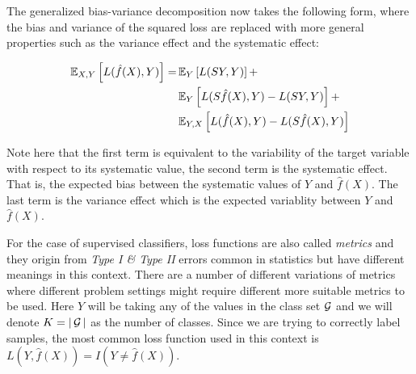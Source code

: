 The generalized bias-variance decomposition now takes the following form, where the bias and variance of the squared loss are replaced with more general properties such as the variance effect and the systematic effect:

\begin{equation}
\begin{split}
\operatorname{\mathbb{E}}_{X,Y} \left[ L(\hat{f}(X),Y )\right] = &  \operatorname{\mathbb{E}}_{Y} \left[ L(SY,Y )\right] + \\
  &  \operatorname{\mathbb{E}}_{Y} \left[ L(S\hat{f}(X),Y ) - L(SY,Y )\right] + \\
  &  \operatorname{\mathbb{E}}_{Y,X} \left[ L(\hat{f}(X),Y ) - L(S\hat{f}(X),Y )\right]
\end{split}
\end{equation}

Note here that the first term is equivalent to the variability of the target variable with respect to its systematic value, the second term is the systematic effect. That is, the expected bias between the systematic values of $Y$ and $\hat{f}(X)$. The last term is the variance effect which is the expected variablity between $Y$ and $\hat{f}(X)$.





For the case of supervised classifiers, loss functions are also called \textit{metrics} and they origin from \textit{Type I \& Type II} errors common in statistics but have different meanings in this context.  There are a number of different variations of metrics where different problem settings might require different more suitable metrics to be used. Here $Y$ will be taking any of the values in the class set $\operatorname{\mathcal{G}}$ and we will denote $K = |\operatorname{\mathcal{G}}|$ as the number of classes. Since we are trying to correctly label samples, the most common loss function used in this context is $L(Y, \hat{f}(X)) = I(Y \neq \hat{f}(X))$.

